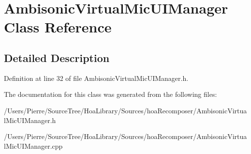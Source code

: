 \hypertarget{class_ambisonic_virtual_mic_u_i_manager}{\section{Ambisonic\-Virtual\-Mic\-U\-I\-Manager Class Reference}
\label{class_ambisonic_virtual_mic_u_i_manager}
}


\subsection{Detailed Description}


Definition at line 32 of file Ambisonic\-Virtual\-Mic\-U\-I\-Manager.\-h.



The documentation for this class was generated from the following files\-:\begin{DoxyCompactItemize}
\item 
/\-Users/\-Pierre/\-Source\-Tree/\-Hoa\-Library/\-Sources/hoa\-Recomposer/Ambisonic\-Virtual\-Mic\-U\-I\-Manager.\-h\item 
/\-Users/\-Pierre/\-Source\-Tree/\-Hoa\-Library/\-Sources/hoa\-Recomposer/Ambisonic\-Virtual\-Mic\-U\-I\-Manager.\-cpp\end{DoxyCompactItemize}
